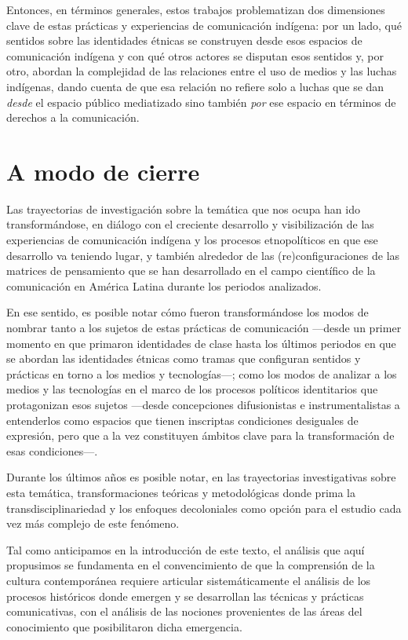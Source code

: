 \documentclass{tufte-handout}
\begin{document}
Entonces, en términos generales, estos trabajos problematizan dos
dimensiones clave de estas prácticas y experiencias de comunicación
indígena: por un lado, qué sentidos sobre las identidades étnicas se
construyen desde esos espacios de comunicación indígena y con qué otros
actores se disputan esos sentidos y, por otro, abordan la complejidad de
las relaciones entre el uso de medios y las luchas indígenas, dando
cuenta de que esa relación no refiere solo a luchas que se dan
\emph{desde} el espacio público mediatizado sino también \emph{por} ese
espacio en términos de derechos a la comunicación.

\hypertarget{a-modo-de-cierre}{%
\section{A modo de cierre}\label{a-modo-de-cierre}}

Las trayectorias de investigación sobre la temática que nos ocupa han
ido transformándose, en diálogo con el creciente desarrollo y
visibilización de las experiencias de comunicación indígena y los
procesos etnopolíticos en que ese desarrollo va teniendo lugar, y
también alrededor de las (re)configuraciones de las matrices de
pensamiento que se han desarrollado en el campo científico de la
comunicación en América Latina durante los periodos analizados.

En ese sentido, es posible notar cómo fueron transformándose los modos
de nombrar tanto a los sujetos de estas prácticas de comunicación
---desde un primer momento en que primaron identidades de clase hasta
los últimos periodos en que se abordan las identidades étnicas como
tramas que configuran sentidos y prácticas en torno a los medios y
tecnologías---; como los modos de analizar a los medios y las
tecnologías en el marco de los procesos políticos identitarios que
protagonizan esos sujetos ---desde concepciones difusionistas e
instrumentalistas a entenderlos como espacios que tienen inscriptas
condiciones desiguales de expresión, pero que a la vez constituyen
ámbitos clave para la transformación de esas condiciones---.

Durante los últimos años es posible notar, en las trayectorias
investigativas sobre esta temática, transformaciones teóricas y
metodológicas donde prima la transdisciplinariedad y los enfoques
decoloniales como opción para el estudio cada vez más complejo de este
fenómeno.

Tal como anticipamos en la introducción de este texto, el análisis que
aquí propusimos se fundamenta en el convencimiento de que la comprensión
de la cultura contemporánea requiere articular sistemáticamente el
análisis de los procesos históricos donde emergen y se desarrollan las
técnicas y prácticas comunicativas, con el análisis de las nociones
provenientes de las áreas del conocimiento que posibilitaron dicha
emergencia.
\end{document}
